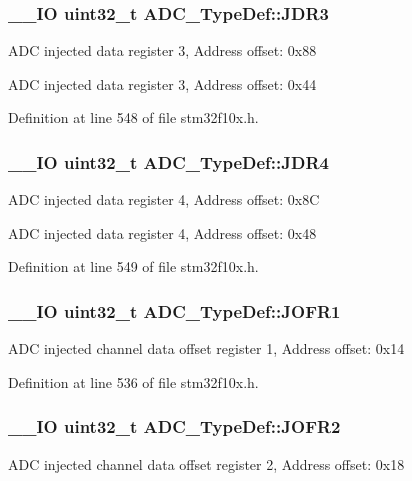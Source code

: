 \hypertarget{struct_a_d_c___type_def_a40999cd0a255ef62b2340e2726695063}{
\subsubsection[{J\-D\-R3}]{\setlength{\rightskip}{0pt plus 5cm}\-\_\-\-\_\-\-I\-O {\bf uint32\-\_\-t} A\-D\-C\-\_\-\-Type\-Def\-::\-J\-D\-R3}}\label{struct_a_d_c___type_def_a40999cd0a255ef62b2340e2726695063}
A\-D\-C injected data register 3, Address offset\-: 0x88

A\-D\-C injected data register 3, Address offset\-: 0x44 

Definition at line 548 of file stm32f10x.\-h.

\hypertarget{struct_a_d_c___type_def_abae6e9d688b16ef350878998f5e21c0b}{
\subsubsection[{J\-D\-R4}]{\setlength{\rightskip}{0pt plus 5cm}\-\_\-\-\_\-\-I\-O {\bf uint32\-\_\-t} A\-D\-C\-\_\-\-Type\-Def\-::\-J\-D\-R4}}\label{struct_a_d_c___type_def_abae6e9d688b16ef350878998f5e21c0b}
A\-D\-C injected data register 4, Address offset\-: 0x8\-C

A\-D\-C injected data register 4, Address offset\-: 0x48 

Definition at line 549 of file stm32f10x.\-h.

\hypertarget{struct_a_d_c___type_def_aa005e656f528aaad28d70d61c9db9b81}{
\subsubsection[{J\-O\-F\-R1}]{\setlength{\rightskip}{0pt plus 5cm}\-\_\-\-\_\-\-I\-O {\bf uint32\-\_\-t} A\-D\-C\-\_\-\-Type\-Def\-::\-J\-O\-F\-R1}}\label{struct_a_d_c___type_def_aa005e656f528aaad28d70d61c9db9b81}
A\-D\-C injected channel data offset register 1, Address offset\-: 0x14 

Definition at line 536 of file stm32f10x.\-h.

\hypertarget{struct_a_d_c___type_def_aa20f76044c11042dde41c1060853fb82}{
\subsubsection[{J\-O\-F\-R2}]{\setlength{\rightskip}{0pt plus 5cm}\-\_\-\-\_\-\-I\-O {\bf uint32\-\_\-t} A\-D\-C\-\_\-\-Type\-Def\-::\-J\-O\-F\-R2}}\label{struct_a_d_c___type_def_aa20f76044c11042dde41c1060853fb82}
A\-D\-C injected channel data offset register 2, Address offset\-: 0x18 

